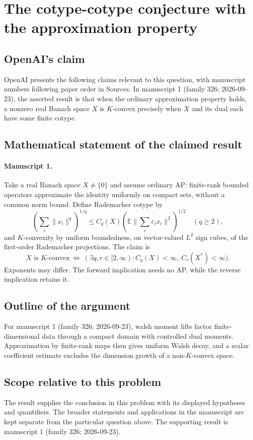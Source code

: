 \documentclass[11pt]{article}
\begin{document}
\section*{The cotype-cotype conjecture with the approximation property}

\subsection{OpenAI's claim}
OpenAI presents the following claims relevant to this question, with manuscript numbers following paper order in Sources. In manuscript 1 (family 326; 2026-09-23), the asserted result is that when the ordinary approximation property holds, a nonzero real Banach space $X$ is $K$-convex precisely when $X$ and its dual each have some finite cotype.

\subsection{Mathematical statement of the claimed result}
\paragraph{Manuscript 1.}
Take a real Banach space $X\ne\{0\}$ and assume ordinary AP: finite-rank bounded operators approximate the identity uniformly on compact sets, without a common norm bound. Define Rademacher cotype by
\[
 (\sum_i\|x_i\|^q)^{1/q}\le C_q(X)(\mathbb E\|\sum_i\varepsilon_ix_i\|^2)^{1/2}\quad(q\ge2),
\]
and $K$-convexity by uniform boundedness, on vector-valued $L^2$ sign cubes, of the first-order Rademacher projections. The claim is
\[
 X\text{ is }K\text{-convex}\ \Longleftrightarrow\
 (\exists q,r\in[2,\infty):C_q(X)<\infty,\ C_r(X^*)<\infty).
\]
Exponents may differ. The forward implication needs no AP, while the reverse implication retains it.

\subsection{Outline of the argument}
For manuscript 1 (family 326; 2026-09-23), walsh moment lifts factor finite-dimensional data through a compact domain with controlled dual moments. Approximation by finite-rank maps then gives uniform Walsh decay, and a scalar coefficient estimate excludes the dimension growth of a non-$K$-convex space.

\subsection{Scope relative to this problem}
The result supplies the conclusion in this problem with its displayed hypotheses and quantifiers. The broader statements and applications in the manuscript are kept separate from the particular question above. The supporting result is manuscript 1 (family 326; 2026-09-23).
\end{document}

